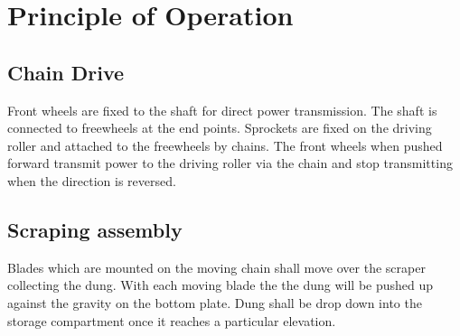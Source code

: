 \chapter{Principle of Operation} \label{Principle of Operation}
\section{Chain Drive} \label{Chain Drive}
Front wheels are fixed to the shaft for direct power transmission. The shaft is connected to freewheels at the end points. Sprockets are fixed on the driving roller and attached to the freewheels by chains. The front wheels when pushed forward transmit power to the driving roller via the chain and stop transmitting when the direction is reversed.


\section{Scraping assembly} \label{Scraping assembly}
Blades which are mounted on the moving chain shall move over the scraper collecting the dung. 
With each moving blade the the dung will be pushed up against the gravity on the bottom plate. 
Dung shall be drop down into the storage compartment once it reaches a particular elevation.
